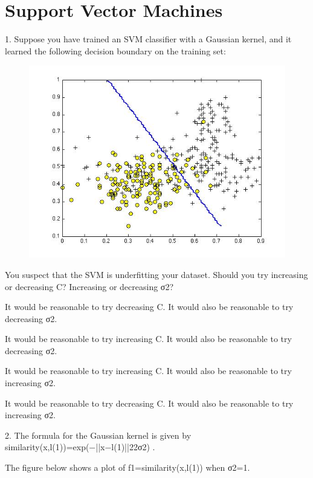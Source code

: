 \documentclass[11pt]{article} %
\begin{document}
	

\section{Support Vector Machines}


1. 
Suppose you have trained an SVM classifier with a Gaussian kernel, and it learned the following decision boundary on the training set:
\begin{figure}
\centering
\includegraphics[width=0.7\linewidth]{images/SVM1}
\caption{}
\label{fig:SVM1}
\end{figure}


You suspect that the SVM is underfitting your dataset. Should you try increasing or decreasing C? Increasing or decreasing σ2?

It would be reasonable to try decreasing C. It would also be reasonable to try decreasing σ2.

It would be reasonable to try increasing C. It would also be reasonable to try decreasing σ2.

It would be reasonable to try increasing C. It would also be reasonable to try increasing σ2.

It would be reasonable to try decreasing C. It would also be reasonable to try increasing σ2.

2. 
The formula for the Gaussian kernel is given by similarity(x,l(1))=exp(−||x−l(1)||22σ2) .

The figure below shows a plot of f1=similarity(x,l(1)) when σ2=1.
\end{document}
